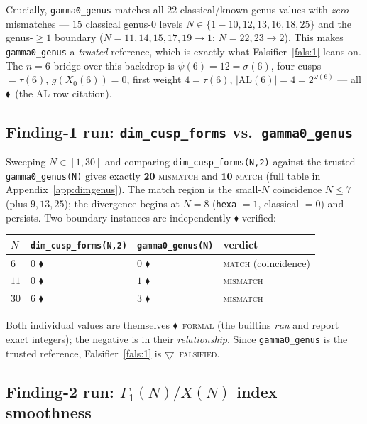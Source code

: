 \documentclass[11pt,a4paper]{article}
\newcommand{\tierF}{\textcolor{blue!60!black}{$\blacklozenge$}}   %
\newcommand{\tierX}{\textcolor{red!70!black}{$\bigtriangledown$}}  %
\newcommand{\sig}{\sigma}
\newcommand{\Go}{\Gamma_1}
\theoremstyle{definition}
\begin{document}
\noindent
Crucially, \texttt{gamma0\_genus} matches all $22$ classical/known genus values
with \emph{zero} mismatches --- $15$ classical genus-$0$ levels
$N\in\{1\!-\!10,12,13,16,18,25\}$ and the genus-$\ge 1$ boundary
($N=11,14,15,17,19\!\to\!1$; $N=22,23\!\to\!2$). This makes
\texttt{gamma0\_genus} a \emph{trusted} reference, which is exactly what
Falsifier~\ref{fals:1} leans on. The $n=6$ bridge over this backdrop is
$\psi(6)=12=\sig(6)$, four cusps $=\tau(6)$, $g(X_0(6))=0$, first weight
$4=\tau(6)$, $|\mathrm{AL}(6)|=4=2^{\omega(6)}$ --- all \tierF\ (the AL row
citation).

\subsection{Finding-1 run: \texttt{dim\_cusp\_forms} vs.\ \texttt{gamma0\_genus}}
\label{sec:run1}

Sweeping $N\in[1,30]$ and comparing \texttt{dim\_cusp\_forms(N,2)} against the
trusted \texttt{gamma0\_genus(N)} gives exactly $\mathbf{20}$ \textsc{mismatch}
and $\mathbf{10}$ \textsc{match} (full table in Appendix~\ref{app:dimgenus}).
The match region is the small-$N$ coincidence $N\le 7$ (plus $9,13,25$); the
divergence begins at $N=8$ (\texttt{hexa} $=1$, classical $=0$) and persists. Two
boundary instances are independently \tierF-verified:
\begin{center}
\begin{tabular}{llll}
\toprule
$N$ & \texttt{dim\_cusp\_forms(N,2)} & \texttt{gamma0\_genus(N)} & verdict \\
\midrule
$6$  & $0$ \tierF & $0$ \tierF & \textsc{match} (coincidence) \\
$11$ & $0$ \tierF & $1$ \tierF & \textsc{mismatch} \\
$30$ & $6$ \tierF & $3$ \tierF & \textsc{mismatch} \\
\bottomrule
\end{tabular}
\end{center}
\noindent
Both individual values are themselves \tierF\ \textsc{formal} (the builtins
\emph{run} and report exact integers); the negative is in their
\emph{relationship}. Since \texttt{gamma0\_genus} is the trusted reference,
Falsifier~\ref{fals:1} is \tierX\ \textsc{falsified}.

\subsection{Finding-2 run: $\Go(N)/X(N)$ index smoothness}
\label{sec:run2}
\end{document}
